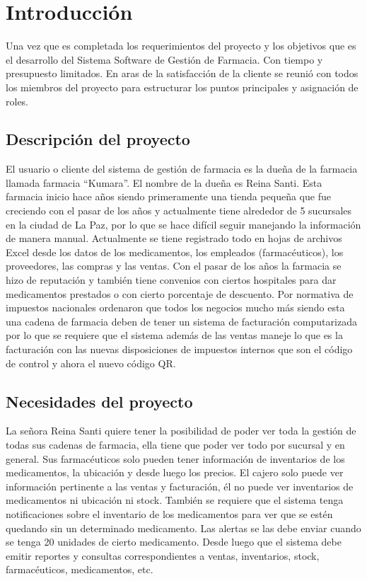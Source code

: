 
\chapter*{Introducción}

Una vez que es completada los requerimientos del proyecto y los objetivos que es el desarrollo del Sistema Software de Gestión de Farmacia. Con tiempo y presupuesto limitados. En aras de la satisfacción de la cliente se reunió con todos los miembros del proyecto para estructurar los puntos principales y asignación de roles. 

\section{Descripción del proyecto}
El usuario o cliente del sistema de gestión de farmacia es la dueña de la farmacia llamada farmacia “Kumara”. El nombre de la dueña es Reina Santi. Esta farmacia inicio hace años siendo primeramente una tienda pequeña que fue creciendo con el pasar de los años y actualmente tiene alrededor de 5 sucursales en la ciudad de La Paz, por lo que se hace difícil seguir manejando la información de manera manual. Actualmente se tiene registrado todo en hojas de archivos Excel desde los datos de los medicamentos, los empleados (farmacéuticos), los proveedores, las compras y las ventas. Con el pasar de los años la farmacia se hizo de reputación y también tiene convenios con ciertos hospitales para dar medicamentos prestados o con cierto porcentaje de descuento. Por normativa de impuestos nacionales ordenaron que todos los negocios mucho más siendo esta una cadena de farmacia deben de tener un sistema de facturación computarizada por lo que se requiere que el sistema además de las ventas maneje lo que es la facturación con las nuevas disposiciones de impuestos internos que son el código de control y ahora el nuevo código QR. 
\section{Necesidades del proyecto}
La señora Reina Santi quiere tener la posibilidad de poder ver toda la gestión de todas sus cadenas de farmacia, ella tiene que poder ver todo por sucursal y en general. Sus farmacéuticos solo pueden tener información de inventarios de los medicamentos, la ubicación y desde luego los precios. El cajero solo puede ver información pertinente a las ventas y facturación, él no puede ver inventarios de medicamentos ni ubicación ni stock. También se requiere que el sistema tenga notificaciones sobre el inventario de los medicamentos para ver que se estén quedando sin un determinado medicamento. Las alertas se las debe enviar cuando se tenga 20 unidades de cierto medicamento. Desde luego que el sistema debe emitir reportes y consultas correspondientes a ventas, inventarios, stock, farmacéuticos, medicamentos, etc.
